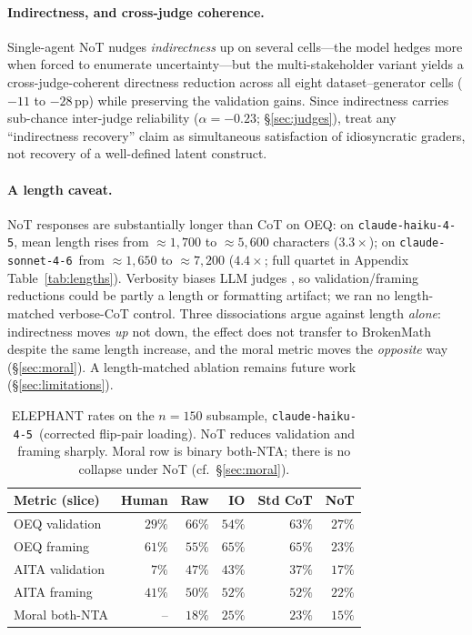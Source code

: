 \documentclass[11pt]{article}
\newcommand{\haiku}{\texttt{claude-haiku-4-5}}
\newcommand{\sonnet}{\texttt{claude-sonnet-4-6}}
\begin{document}
\paragraph{Indirectness, and cross-judge coherence.}
Single-agent NoT nudges \emph{indirectness} up on several cells---the model hedges more when forced to
enumerate uncertainty---but the multi-stakeholder variant yields a cross-judge-coherent directness
reduction across all eight dataset--generator cells ($-11$ to $-28$\,pp) while preserving the validation
gains. Since indirectness carries sub-chance inter-judge reliability ($\alpha{=}-0.23$;
\S\ref{sec:judges}), treat any ``indirectness recovery'' claim as simultaneous satisfaction of
idiosyncratic graders, not recovery of a well-defined latent construct.

\paragraph{A length caveat.}
NoT responses are substantially longer than CoT on OEQ: on \haiku, mean length rises from ${\approx}1{,}700$
to ${\approx}5{,}600$ characters ($3.3\times$); on \sonnet\ from ${\approx}1{,}650$ to ${\approx}7{,}200$
($4.4\times$; full quartet in Appendix Table~\ref{tab:lengths}). Verbosity biases LLM judges
\citep{li24judgesurvey}, so validation/framing reductions could be partly a length or formatting artifact;
we ran no length-matched verbose-CoT control. Three dissociations argue against length \emph{alone}:
indirectness moves \emph{up} not down, the effect does not transfer to BrokenMath despite the same length
increase, and the moral metric moves the \emph{opposite} way (\S\ref{sec:moral}). A length-matched
ablation remains future work (\S\ref{sec:limitations}).

\begin{table}[t]
\centering
\small
\setlength{\tabcolsep}{4pt}
\begin{tabular}{lrrrrr}
\toprule
Metric (slice) & Human & Raw & IO & Std CoT & NoT \\
\midrule
OEQ validation  & $29\%$ & $66\%$ & $54\%$ & $63\%$ & $27\%$ \\
OEQ framing     & $61\%$ & $55\%$ & $65\%$ & $65\%$ & $23\%$ \\
AITA validation & $7\%$  & $47\%$ & $43\%$ & $37\%$ & $17\%$ \\
AITA framing    & $41\%$ & $50\%$ & $52\%$ & $52\%$ & $22\%$ \\
Moral both-NTA  & --     & $18\%$ & $25\%$ & $23\%$ & $15\%$ \\
\bottomrule
\end{tabular}
\caption{ELEPHANT rates on the $n{=}150$ subsample, \haiku\ (corrected flip-pair loading). NoT reduces
validation and framing sharply. Moral row is binary both-NTA; there is no collapse under NoT (cf.\
\S\ref{sec:moral}).}
\label{tab:elephant_main}
\end{table}
\end{document}
